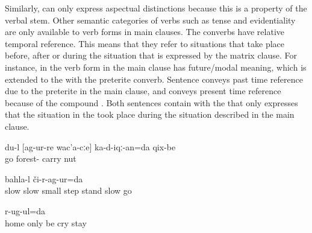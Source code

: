 Similarly,  can only express aspectual distinctions because this is a property of the verbal stem. Other semantic categories of verbs such as tense and evidentiality are only available to verb forms in main clauses. The converbs have relative temporal reference. This means that they refer to situations that take place before, after or during the situation that is expressed by the matrix clause. For instance, in  the verb form in the main clause has future/modal meaning, which is extended to the  with the preterite converb. Sentence  conveys past time reference due to the preterite in the main clause, and  conveys present time reference because of the compound . Both sentences contain  with the  that only expresses that the situation in the  took place during the situation described in the main clause.
%
\begin{exe}
	\ex	\label{ex:I will go to the forest and bring nuts@37}
	\gll	du-l	[ag-ur-re	wac'a-cːe]	ka-d-iqː-an=da	qix-be\\
			go	forest-	carry	nut\\
	\glt	{} 

	\ex	\label{ex:‎Very slowly making small steps we went across (the river)}
		bahla-l	či-r-ag-ur=da\\
		slow	slow	small	step	stand	slow	go\\
	\glt	{} 

	\ex	\label{ex:Being alone at home, I stay not crying}
	\gll	[qili-r	du=gina	r-irχ-ul]	[a-r-isː-ul]	r-ug-ul=da\\
		home	only	be	cry	stay\\
	\glt	{} 
\end{exe}

